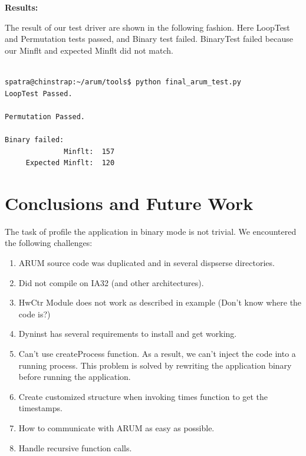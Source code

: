 \documentclass[11pt,letterpaper,oneside]{article}
\begin{document}
{\bf Results:}\newline

The result of our test driver are shown in the following fashion. Here LoopTest and Permutation tests passed, and Binary test failed. BinaryTest failed because our Minflt and expected Minflt did not match. 

\begin{verbatim}

spatra@chinstrap:~/arum/tools$ python final_arum_test.py
LoopTest Passed.

Permutation Passed.

Binary failed:
              Minflt:  157
     Expected Minflt:  120

\end{verbatim}

\section{Conclusions and Future Work}
\label{sec:conclusion}
The task of profile the application in binary mode is not trivial. We encountered the following challenges:
\begin{enumerate}
\item ARUM source code was duplicated and in several dispserse directories.  
\item Did not compile on IA32 (and other architectures).
\item HwCtr Module does not work as described in example (Don't know where the code is?)
\item Dyninst has several requirements to install and get working.
\item Can't use createProcess function. As a result, we can't inject the code into a running process. This problem is solved by rewriting the application binary before running the application.
\item Create customized structure when invoking times function to get the timestamps.
\item How to communicate with ARUM as easy as possible.
\item Handle recursive function calls.
\end{enumerate}
\end{document}
